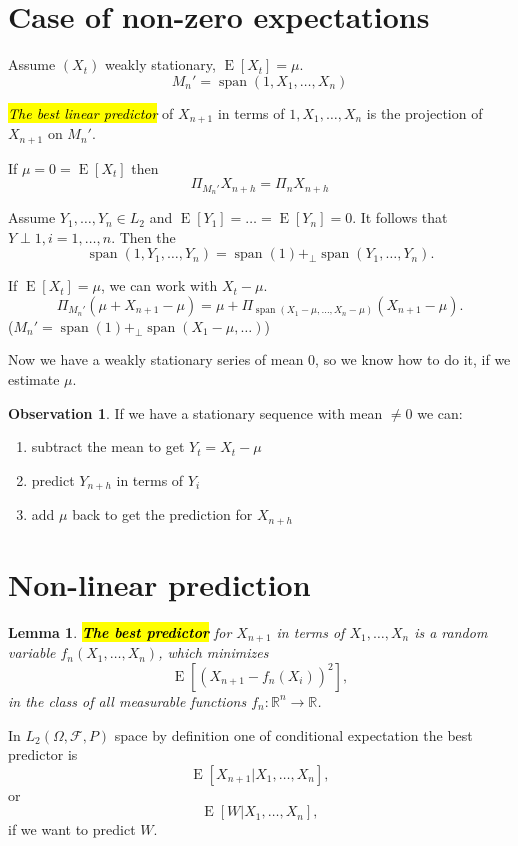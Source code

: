 \documentclass[12pt,a4paper, notitlepage]{book}
\newcommand{\hlc}[2][yellow]{ {\sethlcolor{#1} \hl{#2}} }
\newcommand{\hlcr}[1]{\hlc[lightred]{#1}}
\theoremstyle{definition} %
\newtheorem*{observation}{Observation}
\theoremstyle{plain} %
\newtheorem{definition}{Lemma}[chapter]
\newcommand{\R}{\mathbb R}
\newcommand{\Fc}{\mathcal{ F}}
\DeclareMathOperator{\E}{E}
\DeclareMathOperator{\Span}{span}
\newcommand{\New}[1]{ {\bf \hlcr{#1} } }
\newcommand{\Important}[1]{ {\it \hlc{#1} } }
\begin{document}
\section{Case of non-zero expectations}

Assume $(X_t)$ weakly stationary, $ \E[ X_t] = \mu$.
\[ M_n' = \Span(1, X_1, \dots, X_n) \]

\Important{The best linear predictor} of $X_{n+1}$ in terms of $1, X_1, \dots, X_n$ is the projection of $X_{n+1}$ on $M_n'$.

If $\mu = 0 = \E[ X_t] $ then 
\[ \Pi_{M_n'}X_{n+h} = \Pi_n X_{n+h} \]

Assume $Y_1, \dots, Y_n \in L_2$ and $\E[Y_1] = \dots = \E[Y_n] = 0$. It follows that $Y \perp 1, i = 1, \dots, n$.  Then the 
\[ \Span(1, Y_1, \dots, Y_n) = \Span(1) +_{\perp}  \Span(Y_1, \dots, Y_n). \]

If $ \E[ X_t] = \mu$, we can work with  $ X_t - \mu$. 
\[ \Pi_{M_n'}(\mu + X_{n+1} - \mu) = \mu + \Pi_{\Span(X_1 - \mu, \dots , X_n - \mu)}(X_{n+1}- \mu) . \]
($M_n' = \Span(1) +_{\perp} \Span(X_1 - \mu, \dots)$)

Now we have a weakly stationary series of mean $0$, so we know how to do it, if we estimate $\mu$. 

\begin{observation}
If we have a stationary sequence with mean $\neq 0$ we can:
\begin{enumerate}
\item subtract the mean to get $Y_t = X_t - \mu$
\item predict $Y_{n+h}$ in terms of $Y_i$
\item add $\mu$ back to get the prediction for $X_{n+h}$
\end{enumerate}
\end{observation}

\section{ Non-linear prediction}

\begin{definition}
\New{ The best predictor} for $X_{n+1}$ in terms of $X_1, \dots, X_n$ is a random variable $ f_n(X_1, \ldots , X_n)$, which minimizes 
\[ \E[(X_{n+1}- f_n(X_i))^2] , \]
 in the class of all measurable functions $f_n: \R^n \rightarrow \R$. 
\end{definition}

In $L_2(\Omega, \Fc, P)$ space by definition one of conditional expectation the best predictor is
\[ \E[X_{n+1} | X_1, \dots, X_n] , \]
 or 
\[ \E[W | X_1, \dots, X_n] , \]
 if we want to predict $W$. 
\end{document}
